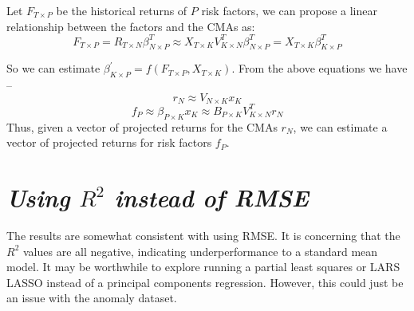 \documentclass{ledger}
\begin{document}
Let $F_{T \times P}$ be the historical returns of $P$ risk factors, we can propose a linear relationship between the factors and the CMAs as:
\begin{equation} 
	F_{T \times P} = R_{T \times N} \beta_{N \times P}^{T} \approx X_{T \times K} V_{K \times N}^{T} \beta_{N \times P}^{T} = X_{T \times K} \beta_{K \times P}^{T} 
\end{equation}

So we can estimate $\beta_{K \times P}^{\prime} = f(F_{T \times P}, X_{T \times K})$. From the above equations we have --
\begin{equation} r_{N} \approx V_{N \times K} x_{K} \end{equation}
\begin{equation} f_{P} \approx \beta_{P \times K} x_{K} \approx B_{P \times K} V_{K \times N}^{T} r_{N} \end{equation}
Thus, given a vector of projected returns for the CMAs $r_{N}$, we can estimate a vector of projected returns for risk factors $f_{P}$.

\newpage

\section*{\normalsize \textit{Using $R^2$ instead of RMSE}}
The results are somewhat consistent with using RMSE. It is concerning that the $R^2$ values are all negative, indicating underperformance to a standard mean model. It may be worthwhile to explore running a partial least squares or LARS LASSO instead of a principal components regression. However, this could just be an issue with the anomaly dataset. \\
\end{document}
